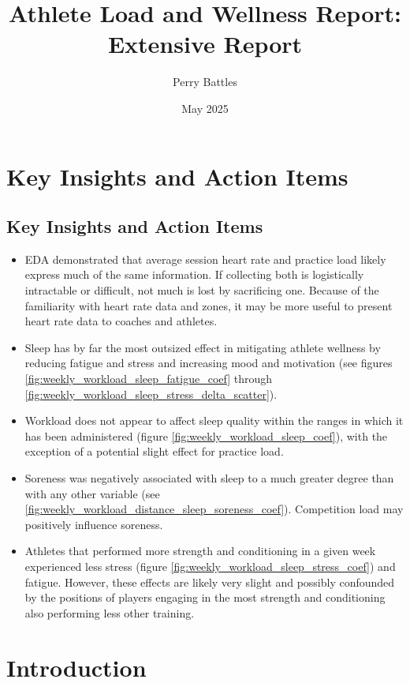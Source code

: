 \documentclass{article}
\title{Athlete Load and Wellness Report: Extensive Report}
\author{Perry Battles}
\date{May 2025}
\begin{document}
	\maketitle

	\section{Key Insights and Action Items}

		\subsection{Key Insights and Action Items}

			\begin{itemize}
				\item EDA demonstrated that average session heart rate and
				practice load likely express much of the same information.
				If collecting both is logistically intractable or difficult,
				not much is lost by sacrificing one. Because of the familiarity
				with heart rate data and zones, it may be more useful to present
				heart rate data to coaches and athletes.
				\item Sleep has by far the most outsized effect in mitigating
				athlete wellness by reducing fatigue and stress and increasing
				mood and motivation (see figures
				\ref{fig:weekly_workload_sleep_fatigue_coef} through
				\ref{fig:weekly_workload_sleep_stress_delta_scatter}).
				\item Workload does not appear to affect sleep quality within
				the ranges in which it has been administered (figure
				\ref{fig:weekly_workload_sleep_coef}), with the exception of a potential
				slight effect for practice load.
				\item Soreness was negatively associated with sleep to a much
				greater degree than with any other variable (see
				\ref{fig:weekly_workload_distance_sleep_soreness_coef}).
				Competition load may positively influence soreness.
				\item Athletes that performed more strength and conditioning
				in a given week experienced less stress (figure
				\ref{fig:weekly_workload_sleep_stress_coef}) and fatigue.
				However, these effects are likely very slight and possibly
				confounded by the positions of players engaging in the most
				strength and conditioning also performing less other training.
			\end{itemize}

	\section{Introduction}
\end{document}
